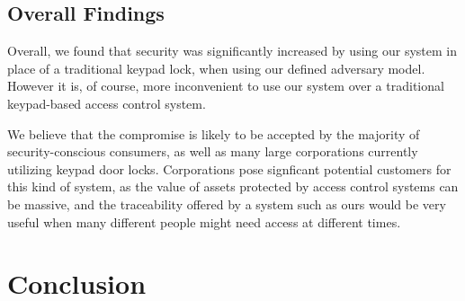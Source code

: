 \documentclass[conference]{IEEEtran}
\begin{document}
\subsection{Overall Findings}
Overall, we found that security was significantly increased by using our system in place of a traditional keypad lock, when using our defined adversary model.
However it is, of course, more inconvenient to use our system over a traditional keypad-based access control system. 

We believe that the compromise is likely to be accepted by the majority of security-conscious consumers, as well as many large corporations currently utilizing keypad door locks.
Corporations pose signficant potential customers for this kind of system, as the value of assets protected by access control systems can be massive, and the traceability offered by a system such as ours would be very useful when many different people might need access at different times.



\section{Conclusion}




\end{document}
